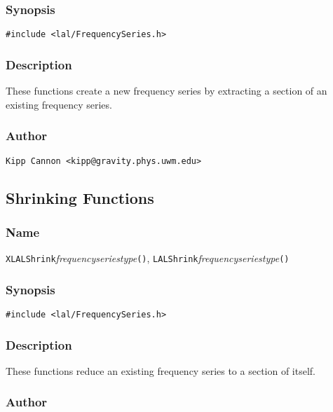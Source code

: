 \subsubsection{Synopsis}

\begin{verbatim}
#include <lal/FrequencySeries.h>
\end{verbatim}


\subsubsection{Description}

These functions create a new frequency series by extracting a section of an
existing frequency series.

\subsubsection{Author}

\verb|Kipp Cannon <kipp@gravity.phys.uwm.edu>|


\subsection{Shrinking Functions}

\subsubsection{Name}

\texttt{XLALShrink}\textit{frequencyseriestype}\texttt{()},
\texttt{LALShrink}\textit{frequencyseriestype}\texttt{()}

\subsubsection{Synopsis}

\begin{verbatim}
#include <lal/FrequencySeries.h>
\end{verbatim}


\subsubsection{Description}

These functions reduce an existing frequency series to a section of itself.

\subsubsection{Author}


